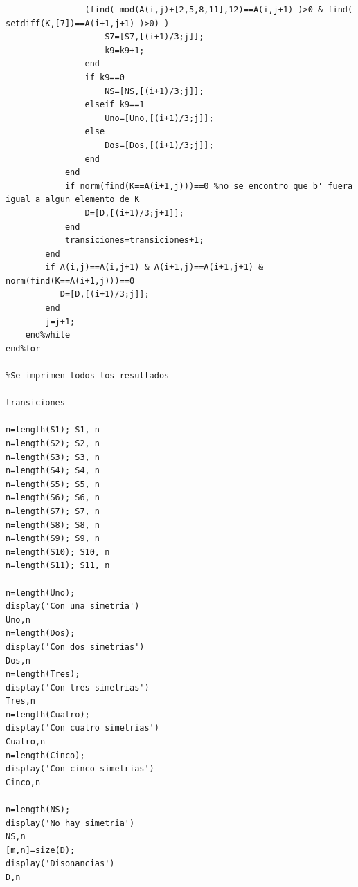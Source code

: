 \documentclass[letterpaper,12pt]{book}
\theoremstyle{definition} \newtheorem{Def}{Definición}[chapter]
\theoremstyle{definition} \newtheorem{Teo}{Teorema}[chapter]
\theoremstyle{definition} \newtheorem{Pro}{Proposición}[chapter]
\theoremstyle{definition} \newtheorem{Lema}{Lema}[chapter]
\begin{document}
{\begin{verbatim}
                (find( mod(A(i,j)+[2,5,8,11],12)==A(i,j+1) )>0 & find( setdiff(K,[7])==A(i+1,j+1) )>0) ) 
                    S7=[S7,[(i+1)/3;j]];
                    k9=k9+1;
                end   
                if k9==0
                    NS=[NS,[(i+1)/3;j]];
                elseif k9==1
                    Uno=[Uno,[(i+1)/3;j]];
                else 
                    Dos=[Dos,[(i+1)/3;j]];      
                end 
            end    
            if norm(find(K==A(i+1,j)))==0 %no se encontro que b' fuera igual a algun elemento de K
                D=[D,[(i+1)/3;j+1]];
            end
            transiciones=transiciones+1;
        end
        if A(i,j)==A(i,j+1) & A(i+1,j)==A(i+1,j+1) & norm(find(K==A(i+1,j)))==0
           D=[D,[(i+1)/3;j]];
        end  
        j=j+1;   
    end%while
end%for

%Se imprimen todos los resultados

transiciones

n=length(S1); S1, n 
n=length(S2); S2, n
n=length(S3); S3, n
n=length(S4); S4, n
n=length(S5); S5, n
n=length(S6); S6, n
n=length(S7); S7, n
n=length(S8); S8, n
n=length(S9); S9, n
n=length(S10); S10, n
n=length(S11); S11, n

n=length(Uno);
display('Con una simetria')
Uno,n
n=length(Dos);
display('Con dos simetrias')
Dos,n
n=length(Tres);
display('Con tres simetrias')
Tres,n
n=length(Cuatro);
display('Con cuatro simetrias')
Cuatro,n
n=length(Cinco);
display('Con cinco simetrias')
Cinco,n

n=length(NS);
display('No hay simetria')
NS,n
[m,n]=size(D);
display('Disonancias')
D,n
\end{verbatim}    
}
\end{document}
